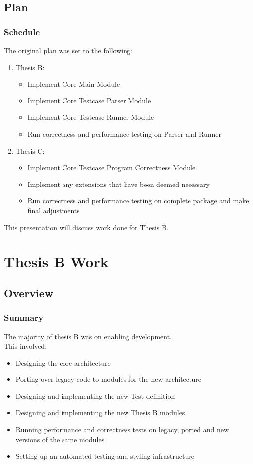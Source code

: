 \documentclass[xcolor]{beamer}
\begin{document}
\subsection{Plan}
\begin{frame}
	\frametitle{Schedule}
	The original plan was set to the following:
	\begin{enumerate}
	\item Thesis B:
	\begin{itemize}
		\item Implement Core Main Module
		\pause
		\item Implement Core Testcase Parser Module
		\pause
		\item Implement Core Testcase Runner Module
		\pause
		\item Run correctness and performance testing on Parser and Runner
		\pause
	\end{itemize}
	\item Thesis C:
	\begin{itemize}
		\item Implement Core Testcase Program Correctness Module
		\pause
		\item Implement any extensions that have been deemed necessary
		\pause
		\item Run correctness and performance testing on complete package and make final adjustments
		\pause
	\end{itemize}
	\end{enumerate}
	This presentation will discuss work done for Thesis B. 
\end{frame}

\section{Thesis B Work}
\subsection{Overview}
\begin{frame}
	\frametitle{Summary}
	The majority of thesis B was on enabling development.\\
	This involved:
	\begin{itemize}
		\item Designing the core architecture
		\pause
		\item Porting over legacy code to modules for the new architecture
		\pause
		\item Designing and implementing the new Test definition
		\pause
		\item Designing and implementing the new Thesis B modules
		\pause
		\item Running performance and correctness tests on legacy, ported and new versions of the same modules
		\pause
		\item Setting up an automated testing and styling infrastructure
	\end{itemize}
\end{frame}
\end{document}
